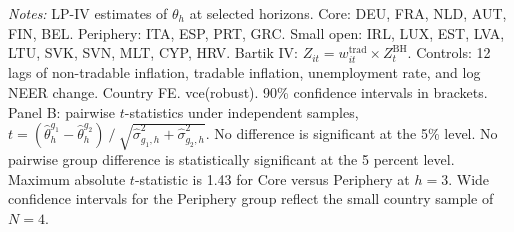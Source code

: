 \begin{table}[htbp]
\begin{threeparttable}
{\begin{tabular}{lccc}
\bottomrule
\end{tabular}
}
\begin{tablenotes}[flushleft]
\footnotesize
\item \textit{Notes:} LP-IV estimates of $\theta_h$ at selected horizons.
Core: DEU, FRA, NLD, AUT, FIN, BEL.
Periphery: ITA, ESP, PRT, GRC.
Small open: IRL, LUX, EST, LVA, LTU, SVK, SVN, MLT, CYP, HRV.
Bartik IV: $Z_{it} = w^{\text{trad}}_{it} \times Z^{\text{BH}}_t$.
Controls: 12 lags of non-tradable inflation, tradable inflation,
unemployment rate, and log NEER change. Country FE. vce(robust).
90\% confidence intervals in brackets.
Panel B: pairwise $t$-statistics under independent samples,
$t = (\hat{\theta}^{g_1}_h - \hat{\theta}^{g_2}_h) \mathbin{/}
\sqrt{\hat{\sigma}^2_{g_1,h} + \hat{\sigma}^2_{g_2,h}}$.
No difference is significant at the 5\% level.
No pairwise group difference is statistically significant at the 5 percent
level. Maximum absolute $t$-statistic is 1.43 for Core versus Periphery at
$h=3$. Wide confidence intervals for the Periphery group reflect the small
country sample of $N=4$.
\end{tablenotes}
\end{threeparttable}
\end{table}
